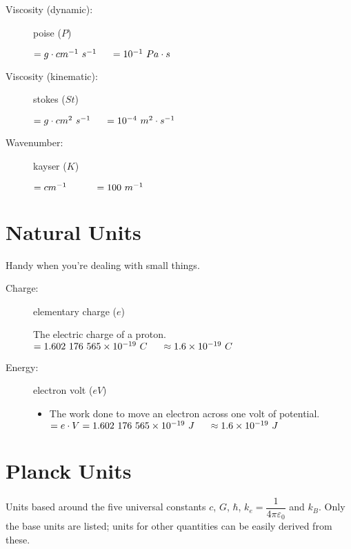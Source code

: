 \begin{description}
\item[Viscosity (dynamic):] poise ($P$)
\begin{itemize}
\items $=g\cdot cm^{-1}\ s^{-1} \tab[0.5cm]=10^{-1}\ Pa\cdot s$
\end{itemize}

\item[Viscosity (kinematic):] stokes ($St$)
\begin{itemize}
\items $=g\cdot cm^{2}\ s^{-1} \tab[0.5cm]=10^{-4}\ m^2 \cdot s^{-1}$
\end{itemize}

\item[Wavenumber:] kayser ($K$)
\begin{itemize}
\items $=cm^{-1} \tab[0.5cm]\tab[0.5cm]=100\ m^{-1}$
\end{itemize}				
\end{description}
			

\section{Natural Units}	
Handy when you're dealing with small things.

\begin{description}				

\item[Charge:] elementary charge ($e$)
\begin{itemize}
\items The electric charge of a proton.
\items $= 1.602\ 176\ 565 \times 10^{-19}\ C \tab[0.5cm]\approx 1.6 \times 10^{-19}\ C$
\end{itemize}

\item[Energy:] electron volt ($eV$)
\begin{itemize}
\item The work done to move an electron across one volt of potential.
\items $= e\cdot V = 1.602\ 176\ 565 \times 10^{-19}\ J \tab[0.5cm]\approx 1.6 \times 10^{-19}\ J$
\end{itemize}					
\end{description}	
            

\section{Planck Units}
Units based around the five universal constants $c$, $G$, $\hbar$, $k_e = \dfrac{1}{4\pi\varepsilon_0}$ and $k_B$. Only the base units are listed; units for other quantities can be easily derived from these.

